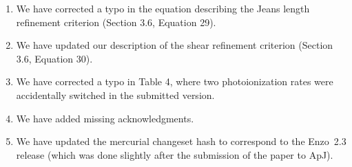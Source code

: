 \documentclass[11pt]{article}
\newcommand{\code}[1]{\textsf{#1}}
\newcommand{\enzo}{\code{Enzo}}
\begin{document}
\begin{enumerate}
\item  We have corrected a typo in the equation describing the Jeans
  length refinement criterion (Section 3.6, Equation 29).

\item We have updated our description of the shear refinement
  criterion (Section 3.6, Equation 30).

\item We have corrected a typo in Table 4, where two photoionization
  rates were accidentally switched in the submitted version.

\item We have added missing acknowledgments.

\item We have updated the mercurial changeset hash to correspond to
  the \enzo\ 2.3 release (which was done slightly after the submission
  of the paper to ApJ).

\end{enumerate}



\newpage



\end{document}
